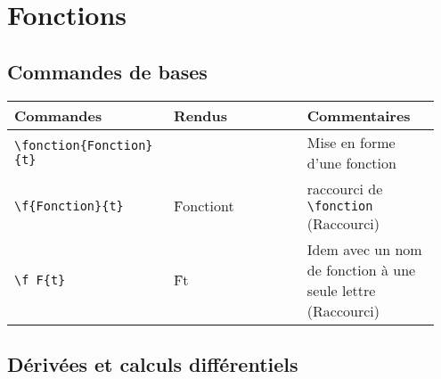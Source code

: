 \documentclass[a4paper,10pt]{article}
\newcommand{\rac}{({\color{red}Raccourci})}
\begin{document}
	\section{Fonctions}

		\subsection{Commandes de bases}

			\noindent
			\begin{tabular}{|p{0.35\linewidth}|p{0.3\linewidth}|p{0.3\linewidth}|}
				\hline
					\textbf{Commandes}&\textbf{Rendus}&\textbf{Commentaires}
				\\\hline\hline
					\verb!\fonction{Fonction}{t}!	&	\fonction{Fonction}{t}		&	Mise en forme d'une fonction
				\\\hline
					\verb!\f{Fonction}{t}!	&	\f{Fonction}{t}		&	raccourci de \verb!\fonction! \rac
				\\\hline
					\verb!\f F{t}!		&	\f F{t}			&	Idem avec un nom de fonction à une seule lettre \rac
				\\\hline
			\end{tabular}


			
		\subsection{Dérivées et calculs différentiels}
\end{document}
